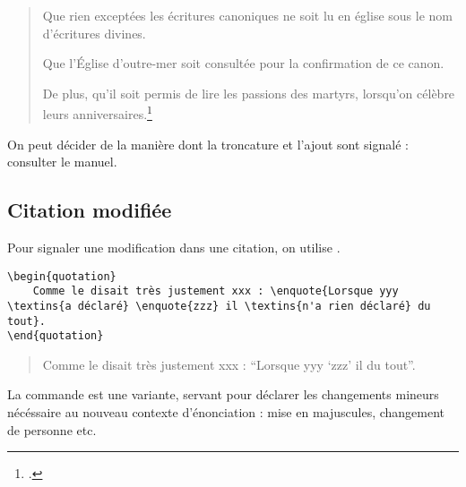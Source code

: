 	\begin{quotation}
	Que rien exceptées les écritures canoniques ne soit lu en église sous le nom d’écritures divines.

Que l’Église d'outre-mer soit consultée pour la confirmation de ce canon.

De plus, qu'il soit permis de lire les passions des martyrs, lorsqu'on célèbre leurs anniversaires.\footcite{BreveHippone}
	\end{quotation}

\begin{anedocte}
On peut décider de la manière dont la troncature et l'ajout sont signalé : consulter le manuel.
\end{anedocte}

\subsection{Citation modifiée}

Pour signaler une modification dans une citation, on utilise  .
\begin{verbatim}
\begin{quotation}
	Comme le disait très justement xxx : \enquote{Lorsque yyy \textins{a déclaré} \enquote{zzz} il \textins{n'a rien déclaré} du tout}.
\end{quotation}
\end{verbatim}

\begin{quotation}
	Comme le disait très justement xxx : \enquote{Lorsque yyy  \enquote{zzz} il  du tout}.
\end{quotation}

La commande  est une variante, servant pour déclarer les changements mineurs nécéssaire au nouveau contexte d'énonciation : mise en majuscules, changement de personne etc.
